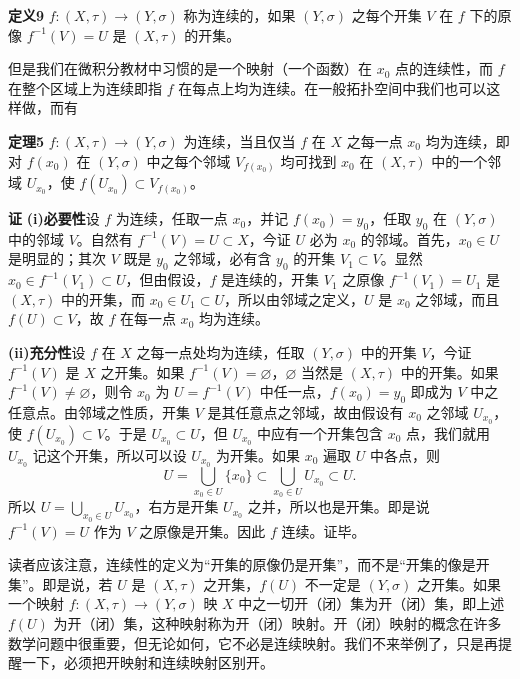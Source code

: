 \noindent\textbf{定义9}\quad
$f:(X,\tau)\to(Y,\sigma)$ 称为连续的，如果 $(Y,\sigma)$ 之每个开集 $V$ 在 $f$ 下的原像 $f^{-1}(V)=U$ 是 $(X,\tau)$ 的开集。

但是我们在微积分教材中习惯的是一个映射（一个函数）在 $x_0$ 点的连续性，而 $f$ 在整个区域上为连续即指 $f$ 在每点上均为连续。在一般拓扑空间中我们也可以这样做，而有

\noindent\textbf{定理5}\quad
$f:(X,\tau)\to(Y,\sigma)$ 为连续，当且仅当 $f$ 在 $X$ 之每一点 $x_0$ 均为连续，即对 $f(x_0)$ 在 $(Y,\sigma)$ 中之每个邻域 $V_{f(x_0)}$ 均可找到 $x_0$ 在 $(X,\tau)$ 中的一个邻域 $U_{x_0}$，使 $f(U_{x_0})\subset V_{f(x_0)}$。

\noindent\textbf{证}\quad
\textbf{(i)必要性}\quad 设 $f$ 为连续，任取一点 $x_0$，并记 $f(x_0)=y_0$，任取 $y_0$ 在 $(Y,\sigma)$ 中的邻域 $V$。自然有 $f^{-1}(V)=U\subset X$，今证 $U$ 必为 $x_0$ 的邻域。首先，$x_0\in U$ 是明显的；其次 $V$ 既是 $y_0$ 之邻域，必有含 $y_0$ 的开集 $V_1\subset V$。显然 $x_0\in f^{-1}(V_1)\subset U$，但由假设，$f$ 是连续的，开集 $V_1$ 之原像 $f^{-1}(V_1)=U_1$ 是 $(X,\tau)$ 中的开集，而 $x_0\in U_1\subset U$，所以由邻域之定义，$U$ 是 $x_0$ 之邻域，而且 $f(U)\subset V$，故 $f$ 在每一点 $x_0$ 均为连续。

\textbf{(ii)充分性}\quad 设 $f$ 在 $X$ 之每一点处均为连续，任取 $(Y,\sigma)$ 中的开集 $V$，今证 $f^{-1}(V)$ 是 $X$ 之开集。如果 $f^{-1}(V)=\varnothing$，$\varnothing$ 当然是 $(X,\tau)$ 中的开集。如果 $f^{-1}(V)\ne\varnothing$，则令 $x_0$ 为 $U=f^{-1}(V)$ 中任一点，$f(x_0)=y_0$ 即成为 $V$ 中之任意点。由邻域之性质，开集 $V$ 是其任意点之邻域，故由假设有 $x_0$ 之邻域 $U_{x_0}$，使 $f(U_{x_0})\subset V$。于是 $U_{x_0}\subset U$，但 $U_{x_0}$ 中应有一个开集包含 $x_0$ 点，我们就用 $U_{x_0}$ 记这个开集，所以可以设 $U_{x_0}$ 为开集。如果 $x_0$ 遍取 $U$ 中各点，则
\[
 U=\bigcup_{x_0\in U}\{x_0\}\subset\bigcup_{x_0\in U}U_{x_0}\subset U.
\]
所以 $U=\bigcup_{x_0\in U}U_{x_0}$，右方是开集 $U_{x_0}$ 之并，所以也是开集。即是说 $f^{-1}(V)=U$ 作为 $V$ 之原像是开集。因此 $f$ 连续。证毕。

读者应该注意，连续性的定义为“开集的原像仍是开集”，而不是“开集的像是开集”。即是说，若 $U$ 是 $(X,\tau)$ 之开集，$f(U)$ 不一定是 $(Y,\sigma)$ 之开集。如果一个映射 $f:(X,\tau)\to(Y,\sigma)$ 映 $X$ 中之一切开（闭）集为开（闭）集，即上述 $f(U)$ 为开（闭）集，这种映射称为开（闭）映射。开（闭）映射的概念在许多数学问题中很重要，但无论如何，它不必是连续映射。我们不来举例了，只是再提醒一下，必须把开映射和连续映射区别开。

